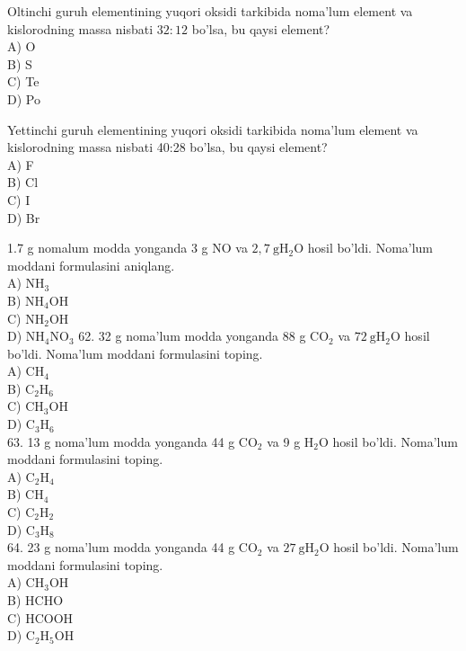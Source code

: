   \item Oltinchi guruh elementining yuqori oksidi tarkibida noma'lum element va kislorodning massa nisbati $32: 12$ bo'lsa, bu qaysi element?\\
A) O\\
B) S\\
C) Te\\
D) Po
  \item Yettinchi guruh elementining yuqori oksidi tarkibida noma'lum element va kislorodning massa nisbati 40:28 bo'lsa, bu qaysi element?\\
A) F\\
B) Cl\\
C) I\\
D) Br
  \item 1.7 g nomalum modda yonganda 3 g NO va $2,7 \mathrm{~g} \mathrm{H}_{2} \mathrm{O}$ hosil bo'ldi. Noma'lum moddani formulasini aniqlang.\\
A) $\mathrm{NH}_{3}$\\
B) $\mathrm{NH}_{4} \mathrm{OH}$\\
C) $\mathrm{NH}_{2} \mathrm{OH}$\\
D) $\mathrm{NH}_{4} \mathrm{NO}_{3}$
62. 32 g noma'lum modda yonganda 88 g $\mathrm{CO}_{2}$ va $72 \mathrm{~g} \mathrm{H}_{2} \mathrm{O}$ hosil bo'ldi. Noma'lum moddani formulasini toping.\\
A) $\mathrm{CH}_{4}$\\
B) $\mathrm{C}_{2} \mathrm{H}_{6}$\\
C) $\mathrm{CH}_{3} \mathrm{OH}$\\
D) $\mathrm{C}_{3} \mathrm{H}_{6}$\\
63. 13 g noma'lum modda yonganda 44 g $\mathrm{CO}_{2}$ va 9 g $\mathrm{H}_{2} \mathrm{O}$ hosil bo'ldi. Noma'lum moddani formulasini toping.\\
A) $\mathrm{C}_{2} \mathrm{H}_{4}$\\
B) $\mathrm{CH}_{4}$\\
C) $\mathrm{C}_{2} \mathrm{H}_{2}$\\
D) $\mathrm{C}_{3} \mathrm{H}_{8}$\\
64. 23 g noma'lum modda yonganda 44 g $\mathrm{CO}_{2}$ va $27 \mathrm{~g} \mathrm{H}_{2} \mathrm{O}$ hosil bo'ldi. Noma'lum moddani formulasini toping.\\
A) $\mathrm{CH}_{3} \mathrm{OH}$\\
B) HCHO\\
C) HCOOH\\
D) $\mathrm{C}_{2} \mathrm{H}_{5} \mathrm{OH}$\\
